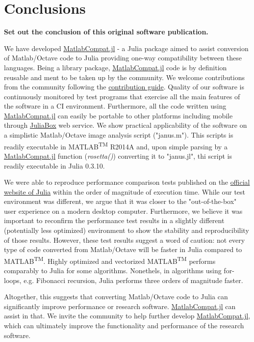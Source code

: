 \section{Conclusions}

\textbf{Set out the conclusion of this original software publication.}

We have developed \href{https://github.com/MatlabCompat/MatlabCompat.jl}{MatlabCompat.jl} - a Julia package aimed to assist conversion of Matlab/Octave code to Julia providing one-way compatibility between these languages. Being a library package, \href{https://github.com/MatlabCompat/MatlabCompat.jl}{MatlabCompat.jl} code is by definition reusable and ment to be taken up by the community. We welcome contributions from the community following the \href{http://matlabcompat.github.io/contribute.html}{contribution guide}. Quality of our software is continuously monitored by test programs that exercise all the main features of the software in a CI environment. Furthermore, all the code written using \href{https://github.com/MatlabCompat/MatlabCompat.jl}{MatlabCompat.jl} can easily be portable to other platforms including mobile through \href{https://www.juliabox.org/}{JuliaBox} web service. We show practical applicability of the software on a simplistic Matlab/Octave image analysis script ("janus.m"). This scripts is readily executable in MATLAB\textsuperscript{TM} R2014A and, upon simple parsing by a \href{https://github.com/MatlabCompat/MatlabCompat.jl}{MatlabCompat.jl} function (\textit{rosetta()}) converting it to "janus.jl", thi script is readily executable in Julia 0.3.10.

We were able to reproduce performance comparison tests published on the \href{http://julialang.org/benchmarks/}{official website of Julia} within the order of magnitude of execution time. While our test environment was different, we argue that it was closer to the "out-of-the-box" user experience on a modern desktop computer. Furthermore, we believe it was important to reconfirm the performance test results in a slightly different (potentially less optimized) environment to show the stability and reproducibility of those results. However, these test results suggest a word of caution: not every type of code converted from Matlab/Octave will be faster in Julia compared to MATLAB\textsuperscript{TM}. Highly optimized and vectorized MATLAB\textsuperscript{TM} performs comparably to Julia for some algorithms. Nonethels, in algorithms using for-loops, e.g. Fibonacci recursion, Julia performs three orders of magnitude faster.

Altogether, this suggests that converting Matlab/Octave code to Julia can significantly improve performance or research software. \href{https://github.com/MatlabCompat/MatlabCompat.jl}{MatlabCompat.jl} can assist in that. We invite the community to help further develop \href{https://github.com/MatlabCompat/MatlabCompat.jl}{MatlabCompat.jl}, which can ultimately improve the functionality and performance of the research software.
  
  
  